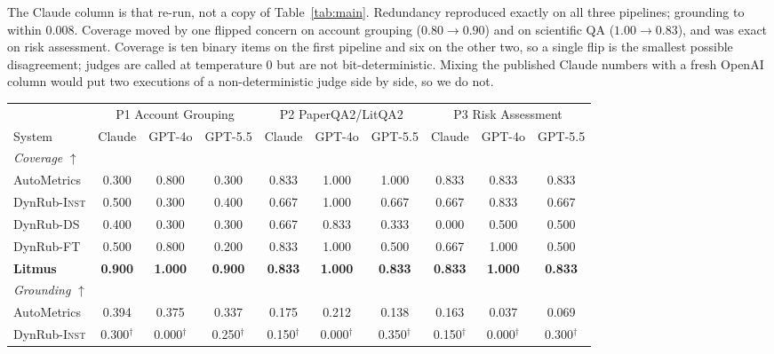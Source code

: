 \documentclass[11pt]{article}
\begin{document}
The Claude column is that re-run, not a copy of Table~\ref{tab:main}. Redundancy reproduced exactly on all three pipelines; grounding to within $0.008$. Coverage moved by one flipped concern on account grouping ($0.80\rightarrow 0.90$) and on scientific QA ($1.00\rightarrow 0.83$), and was exact on risk assessment. Coverage is ten binary items on the first pipeline and six on the other two, so a single flip is the smallest possible disagreement; judges are called at temperature 0 but are not bit-deterministic. Mixing the published Claude numbers with a fresh OpenAI column would put two executions of a non-deterministic judge side by side, so we do not.

\begin{table}[t]
\centering
\small
\setlength{\tabcolsep}{4.5pt}
\begin{tabular}{l ccc ccc ccc}
\toprule
& \multicolumn{3}{c}{P1 Account Grouping} & \multicolumn{3}{c}{P2 PaperQA2/LitQA2} & \multicolumn{3}{c}{P3 Risk Assessment} \\
\cmidrule(lr){2-4}\cmidrule(lr){5-7}\cmidrule(lr){8-10}
System & Claude & GPT-4o & GPT-5.5 & Claude & GPT-4o & GPT-5.5 & Claude & GPT-4o & GPT-5.5 \\
\midrule
\multicolumn{10}{l}{\emph{Coverage} $\uparrow$} \\
AutoMetrics            & 0.300 & 0.800 & 0.300 & 0.833 & 1.000 & 1.000 & 0.833 & 0.833 & 0.833 \\
DynRub-\textsc{Inst}   & 0.500 & 0.300 & 0.400 & 0.667 & 1.000 & 0.667 & 0.667 & 0.833 & 0.667 \\
DynRub-\textsc{DS}     & 0.400 & 0.300 & 0.300 & 0.667 & 0.833 & 0.333 & 0.000 & 0.500 & 0.500 \\
DynRub-\textsc{FT}     & 0.500 & 0.800 & 0.200 & 0.833 & 1.000 & 0.500 & 0.667 & 1.000 & 0.500 \\
\textbf{Litmus}        & \textbf{0.900} & \textbf{1.000} & \textbf{0.900} & \textbf{0.833} & \textbf{1.000} & \textbf{0.833} & \textbf{0.833} & \textbf{1.000} & \textbf{0.833} \\
\midrule
\multicolumn{10}{l}{\emph{Grounding} $\uparrow$} \\
AutoMetrics            & 0.394 & 0.375 & 0.337 & 0.175 & 0.212 & 0.138 & 0.163 & 0.037 & 0.069 \\
DynRub-\textsc{Inst}   & 0.300$^{\dagger}$ & 0.000$^{\dagger}$ & 0.250$^{\dagger}$ & 0.150$^{\dagger}$ & 0.000$^{\dagger}$ & 0.350$^{\dagger}$ & 0.150$^{\dagger}$ & 0.000$^{\dagger}$ & 0.300$^{\dagger}$ \\

\end{tabular}
\end{table}
\end{document}

